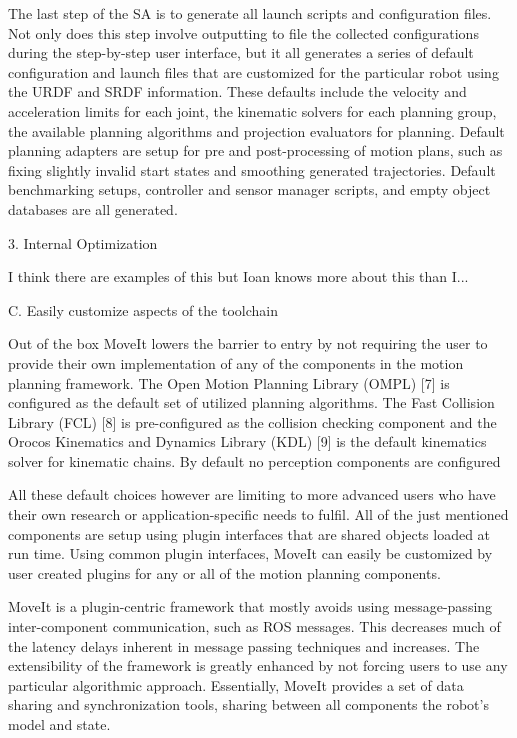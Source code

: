 \documentclass[10pt,journal,compsoc]{joser1}
\begin{document}
{The last step of the SA is to generate all launch scripts and configuration files. Not only does this step involve outputting to file the collected configurations during the step-by-step user interface, but it all generates a series of default configuration and launch files that are customized for the particular robot using the URDF and SRDF information. These defaults include the velocity and acceleration limits for each joint, the kinematic solvers for each planning group, the available planning algorithms and projection evaluators for planning. Default planning adapters are setup for pre and post-processing of motion plans, such as fixing slightly invalid start states and smoothing generated trajectories. Default benchmarking setups, controller and sensor manager scripts, and empty object databases are all generated. 

3. Internal Optimization

I think there are examples of this but Ioan knows more about this than I...

C. Easily customize aspects of the toolchain

Out of the box MoveIt lowers the barrier to entry by not requiring the user to provide their own implementation of any of the components in the motion planning framework. The Open Motion Planning Library (OMPL) [7] is configured as the default set of utilized planning algorithms. The Fast Collision Library (FCL) [8] is pre-configured as the collision checking component and the Orocos Kinematics and Dynamics Library (KDL) [9] is the default kinematics solver for kinematic chains. By default no perception components are configured

All these default choices however are limiting to more advanced users who have their own research or application-specific needs to fulfil. All of the just mentioned components are setup using plugin interfaces that are shared objects loaded at run time. Using common plugin interfaces, MoveIt can easily be customized by user created plugins for any or all of the motion planning components.

MoveIt is a plugin-centric framework that mostly avoids using message-passing inter-component communication, such as ROS messages. This decreases much of the latency delays inherent in message passing techniques and increases. The extensibility of the framework is greatly enhanced by not forcing users to use any particular algorithmic approach. Essentially, MoveIt provides a set of data sharing and synchronization tools, sharing between all components the robot's model and state.

}
\end{document}
